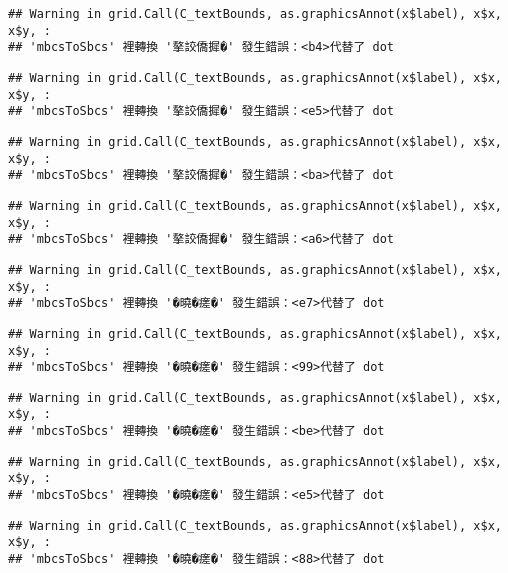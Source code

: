\documentclass[
]{article}
\begin{document}
\begin{verbatim}
## Warning in grid.Call(C_textBounds, as.graphicsAnnot(x$label), x$x, x$y, :
## 'mbcsToSbcs' 裡轉換 '摮詨僑摨�' 發生錯誤：<b4>代替了 dot
\end{verbatim}

\begin{verbatim}
## Warning in grid.Call(C_textBounds, as.graphicsAnnot(x$label), x$x, x$y, :
## 'mbcsToSbcs' 裡轉換 '摮詨僑摨�' 發生錯誤：<e5>代替了 dot
\end{verbatim}

\begin{verbatim}
## Warning in grid.Call(C_textBounds, as.graphicsAnnot(x$label), x$x, x$y, :
## 'mbcsToSbcs' 裡轉換 '摮詨僑摨�' 發生錯誤：<ba>代替了 dot
\end{verbatim}

\begin{verbatim}
## Warning in grid.Call(C_textBounds, as.graphicsAnnot(x$label), x$x, x$y, :
## 'mbcsToSbcs' 裡轉換 '摮詨僑摨�' 發生錯誤：<a6>代替了 dot
\end{verbatim}

\begin{verbatim}
## Warning in grid.Call(C_textBounds, as.graphicsAnnot(x$label), x$x, x$y, :
## 'mbcsToSbcs' 裡轉換 '�曉�瘥�' 發生錯誤：<e7>代替了 dot
\end{verbatim}

\begin{verbatim}
## Warning in grid.Call(C_textBounds, as.graphicsAnnot(x$label), x$x, x$y, :
## 'mbcsToSbcs' 裡轉換 '�曉�瘥�' 發生錯誤：<99>代替了 dot
\end{verbatim}

\begin{verbatim}
## Warning in grid.Call(C_textBounds, as.graphicsAnnot(x$label), x$x, x$y, :
## 'mbcsToSbcs' 裡轉換 '�曉�瘥�' 發生錯誤：<be>代替了 dot
\end{verbatim}

\begin{verbatim}
## Warning in grid.Call(C_textBounds, as.graphicsAnnot(x$label), x$x, x$y, :
## 'mbcsToSbcs' 裡轉換 '�曉�瘥�' 發生錯誤：<e5>代替了 dot
\end{verbatim}

\begin{verbatim}
## Warning in grid.Call(C_textBounds, as.graphicsAnnot(x$label), x$x, x$y, :
## 'mbcsToSbcs' 裡轉換 '�曉�瘥�' 發生錯誤：<88>代替了 dot
\end{verbatim}
\end{document}
